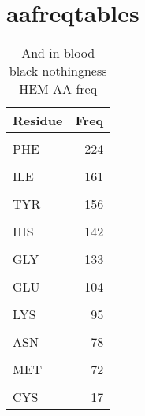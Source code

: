 \section{aafreqtables}
\begin{table}
	\caption{And in blood black nothingness HEM AA freq}
	\label{tbl:HEM_AAfreq}\centering
	\centering
	\begin{tabular}{lr}
		\toprule
		Residue & Freq\\
		\midrule
		\cellcolor{gray!6}{LEU} & \cellcolor{gray!6}{261}\\
		PHE & 224\\
		\cellcolor{gray!6}{ALA} & \cellcolor{gray!6}{188}\\
		ILE & 161\\
		\cellcolor{gray!6}{VAL} & \cellcolor{gray!6}{158}\\
		\addlinespace
		TYR & 156\\
		\cellcolor{gray!6}{ARG} & \cellcolor{gray!6}{146}\\
		HIS & 142\\
		\cellcolor{gray!6}{THR} & \cellcolor{gray!6}{142}\\
		GLY & 133\\
		\addlinespace
		\cellcolor{gray!6}{SER} & \cellcolor{gray!6}{129}\\
		GLU & 104\\
		\cellcolor{gray!6}{ASP} & \cellcolor{gray!6}{99}\\
		LYS & 95\\
		\cellcolor{gray!6}{PRO} & \cellcolor{gray!6}{84}\\
		\addlinespace
		ASN & 78\\
		\cellcolor{gray!6}{GLN} & \cellcolor{gray!6}{78}\\
		MET & 72\\
		\cellcolor{gray!6}{TRP} & \cellcolor{gray!6}{60}\\
		CYS & 17\\
		\bottomrule
	\end{tabular}
\end{table}